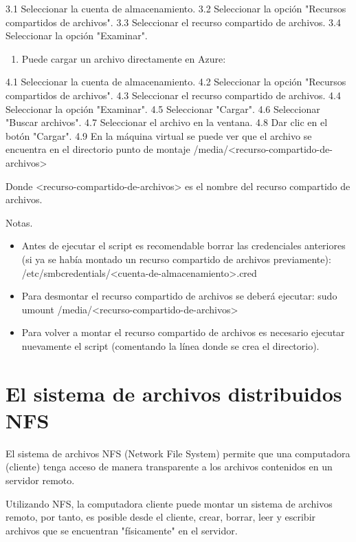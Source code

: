 3.1 Seleccionar la cuenta de almacenamiento. 3.2 Seleccionar la opción "Recursos compartidos de archivos". 3.3 Seleccionar el recurso compartido de archivos. 3.4 Seleccionar la opción "Examinar".

\begin{enumerate}
\item Puede cargar un archivo directamente en Azure:
\end{enumerate}

4.1 Seleccionar la cuenta de almacenamiento. 4.2 Seleccionar la opción "Recursos compartidos de archivos". 4.3 Seleccionar el recurso compartido de archivos. 4.4 Seleccionar la opción "Examinar". 4.5 Seleccionar "Cargar". 4.6 Seleccionar "Buscar archivos". 4.7 Seleccionar el archivo en la ventana. 4.8 Dar clic en el botón "Cargar". 4.9 En la máquina virtual se puede ver que el archivo se encuentra en el directorio punto de montaje /media/<recurso-compartido-de-archivos>

Donde <recurso-compartido-de-archivos> es el nombre del recurso compartido de archivos.

Notas.

\begin{itemize}
\item Antes de ejecutar el script es recomendable borrar las credenciales anteriores (si ya se había montado un recurso compartido de archivos previamente): /etc/smbcredentials/<cuenta-de-almacenamiento>.cred
\item Para desmontar el recurso compartido de archivos se deberá ejecutar: sudo umount /media/<recurso-compartido-de-archivos>
\item Para volver a montar el recurso compartido de archivos es necesario ejecutar nuevamente el script (comentando la línea donde se crea el directorio).
\end{itemize}

\clearpage


\chapter{El sistema de archivos distribuidos NFS}

El sistema de archivos NFS (Network File System) permite que una computadora (cliente) tenga acceso de manera transparente a los archivos contenidos en un servidor remoto.

Utilizando NFS, la computadora cliente puede montar un sistema de archivos remoto, por tanto, es posible desde el cliente, crear, borrar, leer y escribir archivos que se encuentran "físicamente" en el servidor.

